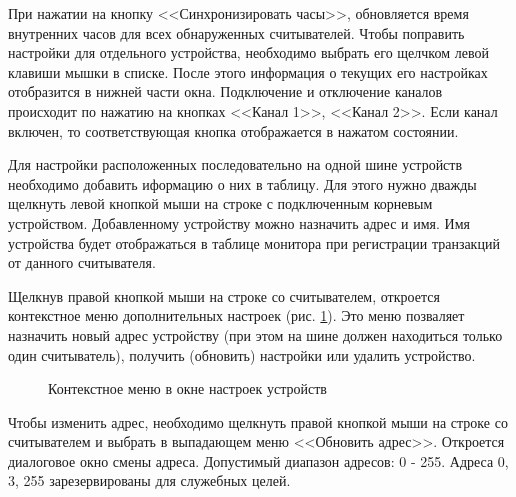 При нажатии на кнопку <<Синхронизировать часы>>, обновляется время внутренних часов для всех обнаруженных считывателей.
Чтобы поправить настройки для отдельного устройства, необходимо выбрать его щелчком левой клавиши мышки в списке.
После этого информация о текущих его настройках отобразится в нижней части окна. 
Подключение и отключение каналов происходит по нажатию на кнопках <<Канал 1>>, <<Канал 2>>.
Если канал включен, то соответствующая кнопка отображается в нажатом состоянии.

Для настройки расположенных последовательно на одной шине устройств необходимо добавить иформацию о них в таблицу. 
Для этого нужно дважды щелкнуть левой кнопкой мыши на строке с подключенным корневым устройством. Добавленному устройству
можно назначить адрес и имя. Имя устройства будет отображаться в таблице монитора при регистрации транзакций от данного считывателя.

Щелкнув правой кнопкой мыши на строке со считывателем, откроется контекстное меню дополнительных настроек (рис. \ref{i:scontext}). Это меню позваляет назначить новый
адрес устройству (при этом на шине должен находиться только один считыватель), получить (обновить) настройки или удалить устройство. 

\begin{figure}[h]
    \caption{Контекстное меню в окне настроек устройств}
    \label{i:scontext}
\end{figure}

Чтобы изменить адрес, необходимо щелкнуть правой кнопкой мыши на строке со считывателем и выбрать в выпадающем меню <<Обновить адрес>>. Откроется 
диалоговое окно смены адреса. Допустимый диапазон адресов: 0 - 255. Адреса 0, 3, 255 зарезервированы для служебных целей.

